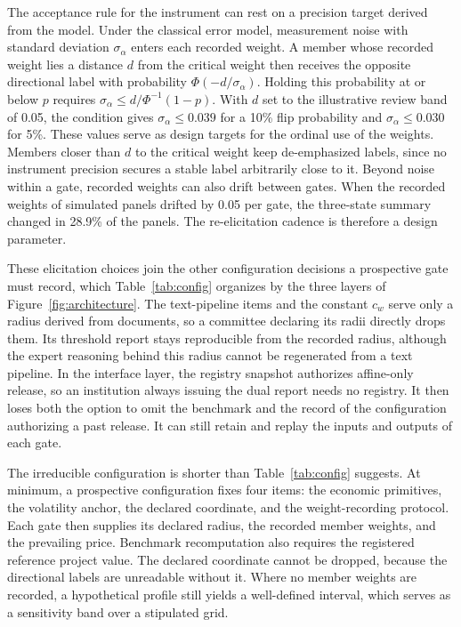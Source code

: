 The acceptance rule for the instrument can rest on a precision target derived from the model. Under the classical error model, measurement noise with standard deviation $\sigma_{\alpha}$ enters each recorded weight. A member whose recorded weight lies a distance $d$ from the critical weight then receives the opposite directional label with probability $\Phi(-d/\sigma_{\alpha})$. Holding this probability at or below $p$ requires $\sigma_{\alpha}\le d/\Phi^{-1}(1-p)$. With $d$ set to the illustrative review band of 0.05, the condition gives $\sigma_{\alpha}\le0.039$ for a 10\% flip probability and $\sigma_{\alpha}\le0.030$ for 5\%. These values serve as design targets for the ordinal use of the weights. Members closer than $d$ to the critical weight keep de-emphasized labels, since no instrument precision secures a stable label arbitrarily close to it. Beyond noise within a gate, recorded weights can also drift between gates. When the recorded weights of simulated panels drifted by 0.05 per gate, the three-state summary changed in 28.9\% of the panels. The re-elicitation cadence is therefore a design parameter.

These elicitation choices join the other configuration decisions a prospective gate must record, which Table~\ref{tab:config} organizes by the three layers of Figure~\ref{fig:architecture}. The text-pipeline items and the constant $c_w$ serve only a radius derived from documents, so a committee declaring its radii directly drops them. Its threshold report stays reproducible from the recorded radius, although the expert reasoning behind this radius cannot be regenerated from a text pipeline. In the interface layer, the registry snapshot authorizes affine-only release, so an institution always issuing the dual report needs no registry. It then loses both the option to omit the benchmark and the record of the configuration authorizing a past release. It can still retain and replay the inputs and outputs of each gate.

The irreducible configuration is shorter than Table~\ref{tab:config} suggests. At minimum, a prospective configuration fixes four items: the economic primitives, the volatility anchor, the declared coordinate, and the weight-recording protocol. Each gate then supplies its declared radius, the recorded member weights, and the prevailing price. Benchmark recomputation also requires the registered reference project value. The declared coordinate cannot be dropped, because the directional labels are unreadable without it. Where no member weights are recorded, a hypothetical profile still yields a well-defined interval, which serves as a sensitivity band over a stipulated grid.


